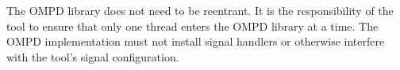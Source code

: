 %
%
\begin{comment}
\ompdsubsection{Memory Management}

The OMPD library must not access the heap manager directly. Instead, if it needs heap memory it 
must use the memory allocation and deallocation callback functions provided by the tool 
to obtain and release heap memory. This will ensure that the library does not interfere with any 
custom memory management scheme that the tool may use.

If the OMPD library is implemented in \code{C++}, memory management operators like \code{new} 
and \code{delete} in all their variants, \emph{must all} be overloaded and implemented in terms of 
the callbacks provided by the tool. The OMPD library must be coded so that any of its 
definitions of \code{new} or \code{delete} do not interfere with any defined by the tool.

In some cases, the OMPD library will need to allocate memory to return results to the
tool. This memory will then be `owned' by the tool, which will be responsible for releasing it. It is 
therefore vital that the OMPD library and the tool use the same memory manager.

OMPD handles are created by the OMPD library. These are opaque to the 
tool, and depending on the specific implementation of OMPD may have complex 
internal structure. The tool cannot know whether the handle pointers returned by the API 
correspond to discrete heap allocations. Consequently, the tool must not simply deallocate a 
handle by passing an address it receives from the OMPD library to its own memory manager. 
Instead, the API includes functions that the tool must use when it no longer needs a handle.

Contexts are created by a tool and passed to the OMPD library. The OMPD 
library does not need to release contexts; instead this will be done by the tool after it releases any 
handles that may be referencing the contexts.
\end{comment}


The OMPD library does not need to be reentrant. It is the responsibility 
of the tool to ensure that only one thread enters the OMPD library at a time. The OMPD 
implementation must not install signal handlers or otherwise interfere with the tool's signal 
configuration.


